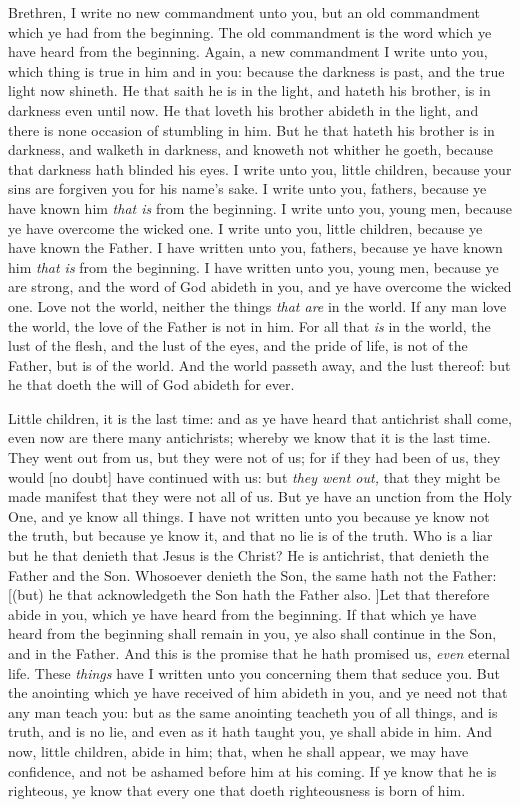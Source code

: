 \documentclass[11pt,letterpaper,oneside]{memoir}
\begin{document}
Brethren, I write no new commandment unto you, but an old commandment
which ye had from the beginning. The old commandment is the word which
ye have heard from the beginning. Again, a new commandment I write unto
you, which thing is true in him and in you: because the darkness is
past, and the true light now shineth. He that saith he is in the light,
and hateth his brother, is in darkness even until now. He that loveth
his brother abideth in the light, and there is none occasion of
stumbling in him. But he that hateth his brother is in darkness, and
walketh in darkness, and knoweth not whither he goeth, because that
darkness hath blinded his eyes. I write unto you, little children,
because your sins are forgiven you for his name's sake. I write unto
you, fathers, because ye have known him \emph{that is} from the
beginning. I write unto you, young men, because ye have overcome the
wicked one. I write unto you, little children, because ye have known the
Father. I have written unto you, fathers, because ye have known him
\emph{that is} from the beginning. I have written unto you, young men,
because ye are strong, and the word of God abideth in you, and ye have
overcome the wicked one. Love not the world, neither the things
\emph{that are} in the world. If any man love the world, the love of the
Father is not in him. For all that \emph{is} in the world, the lust of
the flesh, and the lust of the eyes, and the pride of life, is not of
the Father, but is of the world. And the world passeth away, and the
lust thereof: but he that doeth the will of God abideth for ever.

Little children, it is the last time: and as ye have heard that
antichrist shall come, even now are there many antichrists; whereby we
know that it is the last time. They went out from us, but they were not
of us; for if they had been of us, they would [no doubt] have continued
with us: but \emph{they went out,} that they might be made manifest that
they were not all of us. But ye have an unction from the Holy One, and
ye know all things. I have not written unto you because ye know not the
truth, but because ye know it, and that no lie is of the truth. Who is a
liar but he that denieth that Jesus is the Christ? He is antichrist,
that denieth the Father and the Son. Whosoever denieth the Son, the same
hath not the Father: [(but) he that acknowledgeth the Son hath the
Father also. ]Let that therefore abide in you, which ye have heard from
the beginning. If that which ye have heard from the beginning shall
remain in you, ye also shall continue in the Son, and in the Father. And
this is the promise that he hath promised us, \emph{even} eternal life.
These \emph{things} have I written unto you concerning them that seduce
you. But the anointing which ye have received of him abideth in you, and
ye need not that any man teach you: but as the same anointing teacheth
you of all things, and is truth, and is no lie, and even as it hath
taught you, ye shall abide in him. And now, little children, abide in
him; that, when he shall appear, we may have confidence, and not be
ashamed before him at his coming. If ye know that he is righteous, ye
know that every one that doeth righteousness is born of him.
\end{document}
